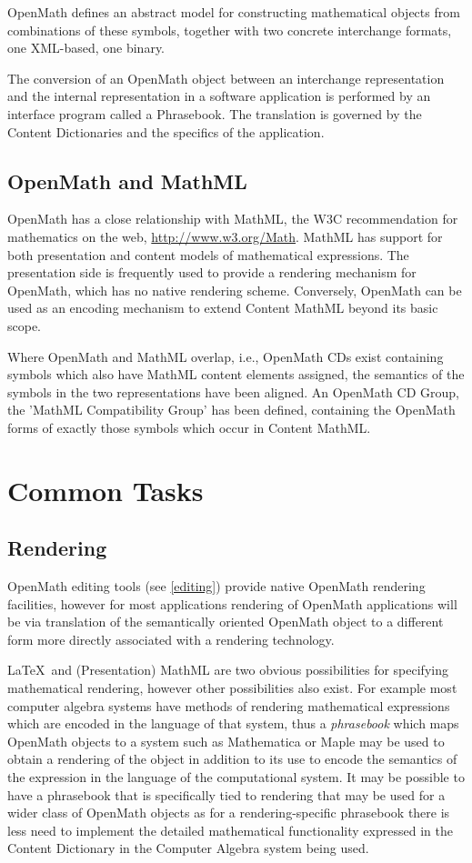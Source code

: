 \documentclass[report,keylogo]{openmath}
\begin{document}
OpenMath defines an abstract model for constructing mathematical
objects from combinations of these symbols, together with two concrete
interchange formats, one XML-based, one binary.

The conversion of an OpenMath object between an interchange
representation and the internal representation in a software
application is performed by an interface program called a Phrasebook.
The translation is governed by the Content Dictionaries and the
specifics of the application.



\subsection {OpenMath and MathML}

OpenMath has a close relationship with MathML, the W3C recommendation
for mathematics on the web, \url{http://www.w3.org/Math}.  MathML has
support for both presentation and content models of mathematical
expressions.  The presentation side is frequently used to provide a
rendering mechanism for OpenMath, which has no native rendering
scheme. Conversely, OpenMath can be used as an encoding mechanism to
extend Content MathML beyond its basic scope.

Where OpenMath and MathML overlap, i.e., OpenMath CDs exist containing
symbols which also have MathML content elements assigned, the
semantics of the symbols in the two representations have been aligned.
An OpenMath CD Group, the 'MathML Compatibility Group' has been
defined, containing the OpenMath forms of exactly those symbols which
occur in Content MathML. 

\section{Common Tasks}

\subsection{Rendering}
OpenMath editing tools (see \ref{editing})  provide native
OpenMath rendering facilities, however for most applications
rendering of OpenMath applications will be via translation of the
semantically oriented OpenMath object to a different form more
directly associated with a rendering technology.

\LaTeX\ and (Presentation) MathML are two obvious possibilities for
specifying mathematical rendering, however other possibilities also
exist. For example most computer algebra systems have methods of
rendering mathematical expressions which are encoded in the language
of that system, thus a \emph{phrasebook} which maps OpenMath objects
to a system such as Mathematica or Maple may be used to obtain a
rendering of the object in addition to its use to encode the semantics
of the expression in the language of the computational system. It may
be possible to have a phrasebook that is specifically tied to
rendering that may be used for a wider class of OpenMath objects as
for a rendering-specific phrasebook there is less need to implement
the detailed mathematical functionality expressed in the Content
Dictionary in the Computer Algebra system being used.
\end{document}
